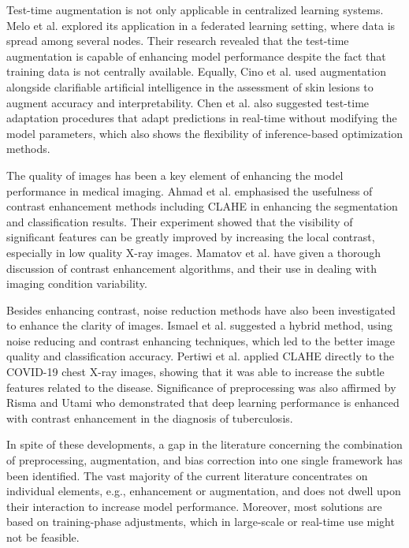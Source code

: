 \documentclass[a4paper,fleqn]{cas-dc}
\begin{document}
Test-time augmentation is not only applicable in centralized learning systems. Melo et al. \cite{ref8} explored its application in a federated learning setting, where data is spread among several nodes. Their research revealed that the test-time augmentation is capable of enhancing model performance despite the fact that training data is not centrally available. Equally, Cino et al. \cite{ref9} used augmentation alongside clarifiable artificial intelligence in the assessment of skin lesions to augment accuracy and interpretability. Chen et al. \cite{ref10} also suggested test-time adaptation procedures that adapt predictions in real-time without modifying the model parameters, which also shows the flexibility of inference-based optimization methods.

The quality of images has been a key element of enhancing the model performance in medical imaging. Ahmad et al. \cite{ref11} emphasised the usefulness of contrast enhancement methods including CLAHE in enhancing the segmentation and classification results. Their experiment showed that the visibility of significant features can be greatly improved by increasing the local contrast, especially in low quality X-ray images. Mamatov et al. \cite{ref12} have given a thorough discussion of contrast enhancement algorithms, and their use in dealing with imaging condition variability.

Besides enhancing contrast, noise reduction methods have also been investigated to enhance the clarity of images. Ismael et al. \cite{ref13} suggested a hybrid method, using noise reducing and contrast enhancing techniques, which led to the better image quality and classification accuracy. Pertiwi et al. \cite{ref14} applied CLAHE directly to the COVID-19 chest X-ray images, showing that it was able to increase the subtle features related to the disease. Significance of preprocessing was also affirmed by Risma and Utami \cite{ref15} who demonstrated that deep learning performance is enhanced with contrast enhancement in the diagnosis of tuberculosis.

In spite of these developments, a gap in the literature concerning the combination of preprocessing, augmentation, and bias correction into one single framework has been identified. The vast majority of the current literature concentrates on individual elements, e.g., enhancement or augmentation, and does not dwell upon their interaction to increase model performance. Moreover, most solutions are based on training-phase adjustments, which in large-scale or real-time use might not be feasible.
\end{document}
